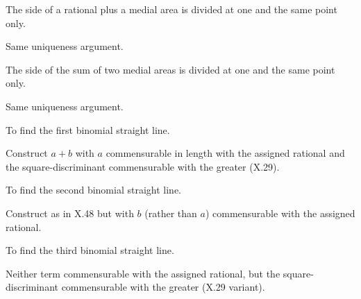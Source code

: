 \begin{claim}
\label{prop:X.46}
The side of a rational plus a medial area is divided at one and the
same point only.
\end{claim}
\begin{evidence}[Proof of X.46]
\label{ev:X.46}
Same uniqueness argument.
\end{evidence}

\begin{claim}
\label{prop:X.47}
The side of the sum of two medial areas is divided at one and the
same point only.
\end{claim}
\begin{evidence}[Proof of X.47]
\label{ev:X.47}
Same uniqueness argument.
\end{evidence}

\begin{claim}
\label{prop:X.48}
To find the first binomial straight line.
\end{claim}
\begin{evidence}[Proof of X.48]
\label{ev:X.48}
Construct $a + b$ with $a$ commensurable in length with the
assigned rational and the square-discriminant commensurable with the
greater (X.29).
\end{evidence}

\begin{claim}
\label{prop:X.49}
To find the second binomial straight line.
\end{claim}
\begin{evidence}[Proof of X.49]
\label{ev:X.49}
Construct as in X.48 but with $b$ (rather than $a$) commensurable
with the assigned rational.
\end{evidence}

\begin{claim}
\label{prop:X.50}
To find the third binomial straight line.
\end{claim}
\begin{evidence}[Proof of X.50]
\label{ev:X.50}
Neither term commensurable with the assigned rational, but the
square-discriminant commensurable with the greater (X.29 variant).
\end{evidence}

